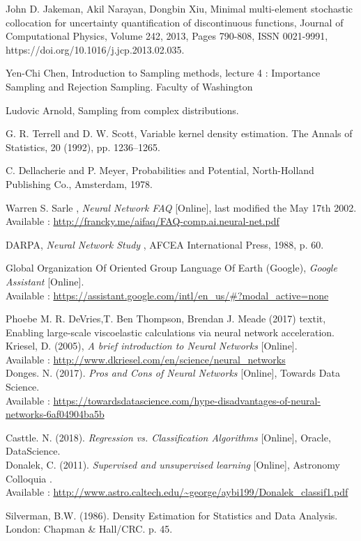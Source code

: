 \documentclass[11pt, a4paper, English]{report}
\begin{document}
\begin{thebibliography}{50}
John D. Jakeman, Akil Narayan, Dongbin Xiu,
Minimal multi-element stochastic collocation for uncertainty quantification of discontinuous functions,
Journal of Computational Physics,
Volume 242,
2013,
Pages 790-808,
ISSN 0021-9991,
https://doi.org/10.1016/j.jcp.2013.02.035.

Yen-Chi Chen, Introduction to Sampling methods, lecture 4 : Importance Sampling and Rejection Sampling. Faculty of Washington

Ludovic Arnold, Sampling from complex distributions.

G. R. Terrell and D. W. Scott, Variable kernel density estimation. The Annals of Statistics, 20 (1992), pp. 1236–1265.

C. Dellacherie and P. Meyer, Probabilities and Potential, North-Holland Publishing Co.,
Amsterdam, 1978.

 Warren S. Sarle
, \textit{Neural Network FAQ} [Online], last modified the May 17th 2002. \\
Available : \url{http://francky.me/aifaq/FAQ-comp.ai.neural-net.pdf}

DARPA, \textit{Neural Network Study} , AFCEA International Press, 1988, p. 60.

Global Organization Of Oriented Group Language Of Earth (Google),  \textit{Google Assistant} [Online]. \\
Available : \url{https://assistant.google.com/intl/en_us/#?modal_active=none}

Phoebe M. R. DeVries,T. Ben Thompson, Brendan J. Meade (2017) textit{, Enabling large-scale viscoelastic calculations via neural network acceleration}. \\
Kriesel, D. (2005),  \textit{A brief introduction to Neural Networks} [Online]. \\
Available : \url{http://www.dkriesel.com/en/science/neural_networks}
\\

Donges. N. (2017).  \textit{Pros and Cons of Neural Networks} [Online], Towards Data Science. \\
Available : \url{https://towardsdatascience.com/hype-disadvantages-of-neural-networks-6af04904ba5b}

Casttle. N. (2018).  \textit{Regression vs. Classification Algorithms} [Online], Oracle, DataScience. \\

 Donalek, C. (2011).  \textit{Supervised and unsupervised learning} [Online], Astronomy Colloquia . \\
Available : \url{http://www.astro.caltech.edu/~george/aybi199/Donalek_classif1.pdf}

 Silverman, B.W. (1986). Density Estimation for Statistics and Data Analysis. London: Chapman & Hall/CRC. p. 45.

\end{thebibliography}
\end{document}
